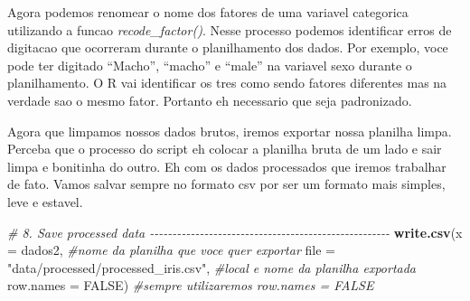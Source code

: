 \documentclass[
]{book}
\newenvironment{Shaded}{\begin{snugshade}}{\end{snugshade}}
\newcommand{\AttributeTok}[1]{\textcolor[rgb]{0.13,0.29,0.53}{#1}}
\newcommand{\CommentTok}[1]{\textcolor[rgb]{0.56,0.35,0.01}{\textit{#1}}}
\newcommand{\ConstantTok}[1]{\textcolor[rgb]{0.56,0.35,0.01}{#1}}
\newcommand{\FunctionTok}[1]{\textcolor[rgb]{0.13,0.29,0.53}{\textbf{#1}}}
\newcommand{\NormalTok}[1]{#1}
\newcommand{\OtherTok}[1]{\textcolor[rgb]{0.56,0.35,0.01}{#1}}
\newcommand{\SpecialCharTok}[1]{\textcolor[rgb]{0.81,0.36,0.00}{\textbf{#1}}}
\newcommand{\StringTok}[1]{\textcolor[rgb]{0.31,0.60,0.02}{#1}}
\begin{document}
Agora podemos renomear o nome dos fatores de uma variavel categorica utilizando a funcao \emph{recode\_factor()}. Nesse processo podemos identificar erros de digitacao que ocorreram durante o planilhamento dos dados. Por exemplo, voce pode ter digitado ``Macho'', ``macho'' e ``male'' na variavel sexo durante o planilhamento. O R vai identificar os tres como sendo fatores diferentes mas na verdade sao o mesmo fator. Portanto eh necessario que seja padronizado.

\begin{Shaded}
\end{Shaded}

Agora que limpamos nossos dados brutos, iremos exportar nossa planilha limpa. Perceba que o processo do script eh colocar a planilha bruta de um lado e sair limpa e bonitinha do outro. Eh com os dados processados que iremos trabalhar de fato. Vamos salvar sempre no formato csv por ser um formato mais simples, leve e estavel.

\begin{Shaded}
\begin{Highlighting}[]
\CommentTok{\# 8. Save processed data {-}{-}{-}{-}{-}{-}{-}{-}{-}{-}{-}{-}{-}{-}{-}{-}{-}{-}{-}{-}{-}{-}{-}{-}{-}{-}{-}{-}{-}{-}{-}{-}{-}{-}{-}{-}{-}{-}{-}{-}{-}{-}{-}{-}{-}{-}{-}{-}{-}{-}{-}{-}{-}}
\FunctionTok{write.csv}\NormalTok{(}\AttributeTok{x =}\NormalTok{ dados2,                                 }\CommentTok{\#nome da planilha que voce quer exportar}
          \AttributeTok{file =} \StringTok{"data/processed/processed\_iris.csv"}\NormalTok{, }\CommentTok{\#local e nome da planilha exportada}
          \AttributeTok{row.names =} \ConstantTok{FALSE}\NormalTok{)                          }\CommentTok{\#sempre utilizaremos row.names = FALSE}
\end{Highlighting}
\end{Shaded}
\end{document}

